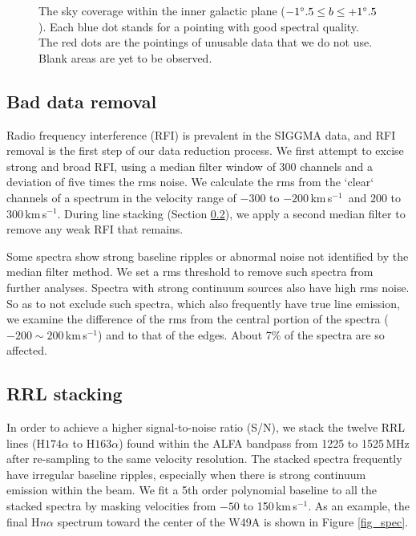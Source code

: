 \documentclass[manuscript]{aastex61}
\newcommand{\kms}{\,km\,s$^{-1}$}
\begin{document}
\begin{figure}[hbtp]
\caption{The sky coverage within the inner galactic plane ($-1\mbox{$^\circ$}.5 \le b \le +1\mbox{$^\circ$}.5$).
Each blue dot stands for a pointing with good spectral quality.
The red dots are the pointings of unusable data that we do not use.
Blank areas are yet to be observed.
}\label{fig_skycover}
\end{figure}

\subsection{Bad data removal} \label{sec_rfi}
Radio frequency interference (RFI) is prevalent in the SIGGMA data, and
RFI removal is the first step of our data reduction process.
We first attempt to excise strong and broad RFI, using a median filter window of 300 channels and a deviation of five times the rms noise.
We calculate the rms from the `clear` channels of a spectrum in the velocity range of $-300$ to $-200$\kms\ and $200$ to $300$\kms.
During line stacking (Section \ref{sec_stack}), we apply a second median filter to remove any weak RFI that remains.

Some spectra show strong baseline ripples or abnormal noise not identified by the median filter method.
We set a rms threshold to remove such spectra from further analyses.
Spectra with strong continuum sources also have high rms noise. 
So as to not exclude such spectra, which also frequently have true line emission, we examine the difference of the rms from the central portion of the spectra ($-200 \sim 200$\kms) and to that of the edges.
About 7\% of the spectra are so affected.

\subsection{RRL stacking} \label{sec_stack}
In order to achieve a higher signal-to-noise ratio (S/N), we stack the twelve RRL lines (H$174\alpha$ to H$163\alpha$) found within the ALFA bandpass from 1225 to 1525\,MHz after re-sampling to the same velocity resolution.
The stacked spectra frequently have irregular baseline ripples, especially when there is strong continuum emission within the beam.
We fit a 5th order polynomial baseline to all the stacked spectra by masking velocities from $-50$ to 150\kms.
As an example, the final H$n\alpha$ spectrum toward the center of the W49A is shown in Figure \ref{fig_spec}.
\end{document}
